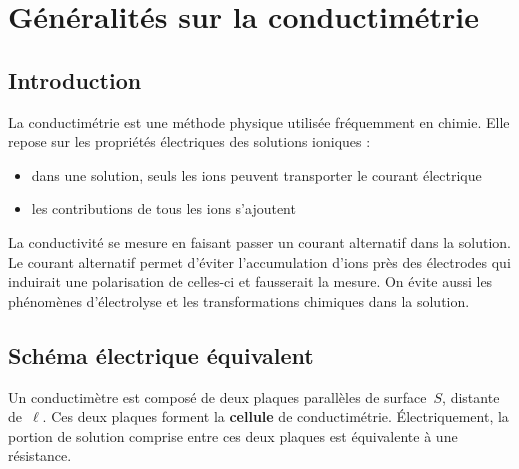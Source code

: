\documentclass{tp}
\begin{document}
\section{Généralités sur la conductimétrie}

\subsection{Introduction}

 La conductimétrie est une méthode physique utilisée fréquemment en chimie. Elle repose sur les propriétés électriques des solutions ioniques :

\begin{itemize}
\item dans une solution, seuls les ions peuvent transporter le courant électrique
\item les contributions de tous les ions s'ajoutent
\end{itemize}


La conductivité se mesure en faisant passer un courant alternatif dans la solution. Le courant alternatif permet d'éviter l'accumulation d'ions près des électrodes qui induirait une polarisation de celles-ci et fausserait la mesure. On évite aussi les phénomènes d'électrolyse et les transformations chimiques dans la solution.


\subsection{Schéma électrique équivalent}

 Un conductimètre est composé de deux plaques parallèles de surface~$S$, distante de~$\ell$. Ces deux plaques forment la \textbf{cellule} de conductimétrie. Électriquement, la portion de solution comprise entre ces deux plaques est équivalente à une résistance.

\begin{center}
\end{center}
\end{document}
